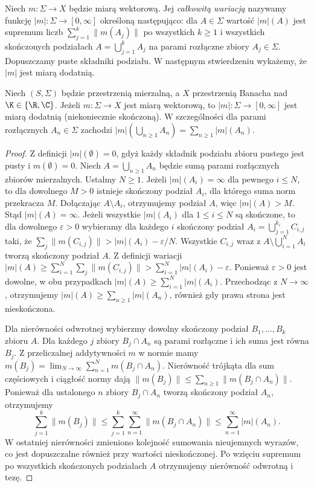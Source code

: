 \begin{definicja}
\label{def:vector-variation15b}
Niech $m:\Sigma\to X$ będzie miarą wektorową.
Jej \emph{całkowitą wariacją} nazywamy funkcję
$|m|:\Sigma\to[0,\infty]$ określoną następująco:
dla $A\in\Sigma$ wartość $|m|(A)$ jest supremum liczb $\sum_{j=1}^k\|m(A_j)\|$
po wszystkich $k\ge1$ i wszystkich skończonych podziałach
$A=\bigcup_{j=1}^k A_j$ na parami rozłączne zbiory $A_j\in\Sigma$.
Dopuszczamy puste składniki podziału. W następnym stwierdzeniu
wykażemy, że $|m|$ jest miarą dodatnią.
\end{definicja}

\begin{stwierdzenie}
\label{prop:variation-measure15b}
Niech $(S,\Sigma)$ będzie przestrzenią mierzalną, a $X$
przestrzenią Banacha nad $\K\in\{\R,\C\}$.
Jeżeli $m:\Sigma\to X$ jest miarą wektorową, to
$|m|:\Sigma\to[0,\infty]$ jest miarą dodatnią (niekoniecznie
skończoną). W szczególności dla parami rozłącznych
$A_n\in\Sigma$ zachodzi
$|m|(\bigcup_{n\ge1}A_n)=\sum_{n\ge1}|m|(A_n)$.
\end{stwierdzenie}
\begin{proof}
Z definicji $|m|(\emptyset)=0$, gdyż każdy składnik
podziału zbioru pustego jest pusty i $m(\emptyset)=0$.
Niech $A=\bigcup_{n\ge1}A_n$ będzie sumą parami rozłącznych
zbiorów mierzalnych. Ustalmy $N\ge1$.
Jeżeli $|m|(A_i)=\infty$ dla pewnego $i\le N$, to dla
dowolnego $M>0$ istnieje skończony podział $A_i$,
dla którego suma norm przekracza $M$. Dołączając
$A\setminus A_i$, otrzymujemy podział $A$, więc $|m|(A)>M$.
Stąd $|m|(A)=\infty$.
Jeżeli wszystkie $|m|(A_i)$ dla $1\le i\le N$ są skończone,
to dla dowolnego $\varepsilon>0$ wybieramy dla każdego $i$
skończony podział $A_i=\bigcup_{j=1}^{k_i}C_{i,j}$
taki, że $\sum_j\|m(C_{i,j})\|>|m|(A_i)-\varepsilon/N$.
Wszystkie $C_{i,j}$ wraz z $A\setminus\bigcup_{i=1}^NA_i$
tworzą skończony podział $A$. Z definicji wariacji
$|m|(A)\ge\sum_{i=1}^N\sum_j\|m(C_{i,j})\|
>\sum_{i=1}^N|m|(A_i)-\varepsilon$.
Ponieważ $\varepsilon>0$ jest dowolne, w obu przypadkach
$|m|(A)\ge\sum_{i=1}^N|m|(A_i)$. Przechodząc z $N\to\infty$,
otrzymujemy $|m|(A)\ge\sum_{n\ge1}|m|(A_n)$,
również gdy prawa strona jest nieskończona.

Dla nierówności odwrotnej wybierzmy dowolny skończony
podział $B_1,\ldots,B_k$ zbioru $A$.
Dla każdego $j$ zbiory $B_j\cap A_n$ są parami rozłączne
i ich suma jest równa $B_j$. Z przeliczalnej addytywności
$m$ w normie mamy
$m(B_j)=\lim_{N\to\infty}\sum_{n=1}^Nm(B_j\cap A_n)$.
Nierówność trójkąta dla sum częściowych i ciągłość normy
dają $\|m(B_j)\|\le\sum_{n\ge1}\|m(B_j\cap A_n)\|$.
Ponieważ dla ustalonego $n$ zbiory $B_j\cap A_n$ tworzą
skończony podział $A_n$, otrzymujemy
\[
 \sum_{j=1}^k\|m(B_j)\|
 \le\sum_{j=1}^k\sum_{n=1}^\infty
        \|m(B_j\cap A_n)\|
 \le\sum_{n=1}^\infty |m|(A_n).
\]
W ostatniej nierówności zmieniono kolejność sumowania
nieujemnych wyrazów, co jest dopuszczalne również przy
wartości nieskończonej. Po wzięciu supremum po wszystkich
skończonych podziałach $A$ otrzymujemy nierówność odwrotną i tezę.
\end{proof}

